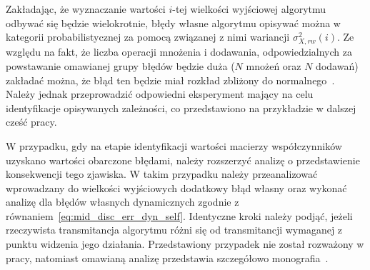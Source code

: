 Zakładając, że wyznaczanie wartości $i$-tej wielkości wyjściowej algorytmu odbywać się będzie wielokrotnie, błędy własne algorytmu opisywać można w kategorii probabilistycznej za pomocą związanej z nimi wariancji $\sigma_{X,rw}^{2}(i)$. Ze względu na fakt, że liczba operacji mnożenia i dodawania, odpowiedzialnych za powstawanie omawianej grupy błędów będzie duża ($N$ mnożeń oraz $N$ dodawań) zakładać można, że błąd ten będzie miał rozkład zbliżony do normalnego~\cite{jcgm_guide}. Należy jednak przeprowadzić odpowiedni eksperyment mający na celu identyfikacje opisywanych zależności, co przedstawiono na przykładzie w dalszej cześć pracy.

W przypadku, gdy na etapie identyfikacji wartości macierzy współczynników uzyskano wartości obarczone błędami, należy rozszerzyć analizę o przedstawienie konsekwencji tego zjawiska. W takim przypadku należy przeanalizować wprowadzany do wielkości wyjściowych dodatkowy błąd własny oraz wykonać analizę dla błędów własnych dynamicznych zgodnie z równaniem~\eqref{eq:mid_disc_err_dyn_self}. Identyczne kroki należy podjąć, jeżeli rzeczywista transmitancja algorytmu różni się od transmitancji wymaganej z punktu widzenia jego działania. Przedstawiony przypadek nie został rozważony w pracy, natomiast omawianą analizę przedstawia szczegółowo monografia~\cite{jakubiec_system}.

